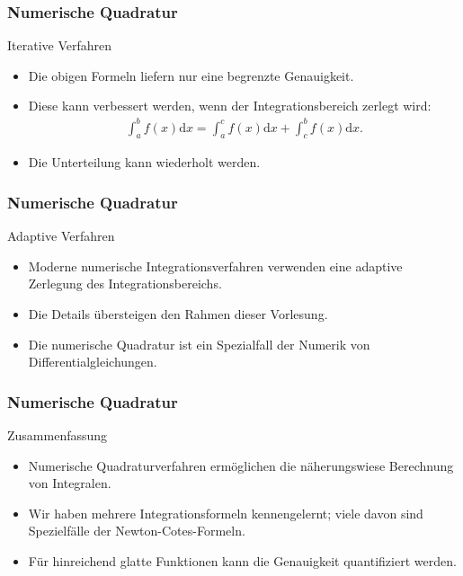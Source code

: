 \documentclass{beamer}
\newcommand\dd{\mathrm d}
\renewcommand{\ae}{\"a}
\renewcommand{\oe}{\"o}
\newcommand{\ue}{\"u}
\newcommand{\mytitle}{Numerische Quadratur}
\begin{document}
\begin{frame}\frametitle{\mytitle}
	\begin{block}{Iterative Verfahren}
		\begin{itemize}
			\item Die obigen Formeln liefern nur eine begrenzte Genauigkeit.
			\item Diese kann verbessert werden, wenn der Integrationsbereich zerlegt wird:
				\begin{align*}
					\int_a^bf(x)\dd x=\int_a^cf(x)\dd x+\int_c^bf(x)\dd x.
				\end{align*}
			\item Die Unterteilung kann wiederholt werden.
		\end{itemize}
	\end{block}
\end{frame}

\begin{frame}\frametitle{\mytitle}
	\begin{block}{Adaptive Verfahren}
		\begin{itemize}
			\item Moderne numerische Integrationsverfahren verwenden eine adaptive Zerlegung des Integrationsbereichs.
			\item Die Details \ue bersteigen den Rahmen dieser Vorlesung.
			\item Die numerische Quadratur ist ein Spezialfall der Numerik von Differentialgleichungen.
		\end{itemize}
	\end{block}
\end{frame}

\begin{frame}\frametitle{\mytitle}
	\begin{block}{Zusammenfassung}
		\begin{itemize}
			\item Numerische Quadraturverfahren erm\oe glichen die n\ae herungswiese Berechnung von Integralen.
			\item Wir haben mehrere Integrationsformeln kennengelernt; viele davon sind Spezielf\ae lle der Newton-Cotes-Formeln.
			\item F\ue r hinreichend glatte Funktionen kann die Genauigkeit quantifiziert werden.
		\end{itemize}
	\end{block}
\end{frame}
\end{document}
